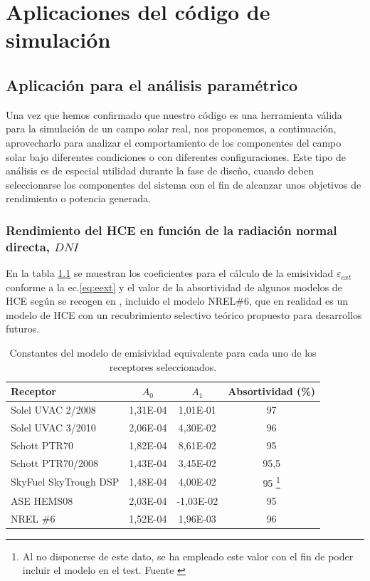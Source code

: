 \chapter{Aplicaciones del código de simulación}
\label{aplicaciones}

\section{Aplicación para el análisis paramétrico}
\label{analisis-parametrico}

Una vez que hemos confirmado que nuestro código es una herramienta válida para la simulación de un campo solar real, nos proponemos, a continuación, aprovecharlo para analizar el comportamiento de los componentes del campo solar bajo diferentes condiciones o con diferentes configuraciones. Este tipo de análisis es de especial utilidad durante la fase de diseño, cuando deben seleccionarse los componentes del sistema con el fin de alcanzar unos objetivos de rendimiento o potencia generada.

\subsection{Rendimiento del HCE en función de la radiación normal directa, $DNI$}

En la tabla \ref{tab:datos_hces} se muestran los coeficientes para el cálculo de la emisividad $\varepsilon_{ext}$ conforme a la ec.\eqref{eq:eext} y el valor de la absortividad de algunos modelos de HCE según se recogen en \cite{barberofresnoDesarrolloModeloTeorico2018}, incluido el modelo NREL\#6, que en realidad es un modelo de HCE con un recubrimiento selectivo teórico propuesto para desarrollos futuros.

\begin{longtable}[c]{lccc}
\caption[Constantes del modelo de emisividad equivalente para cada uno de los receptores seleccionados]{Constantes del modelo de emisividad equivalente para cada uno de los receptores seleccionados.}
\label{tab:datos_hces}  \\ \hline
Receptor &
$A_0$ &
$A_1$ &
Absortividad (\%) \\ \hline
Solel UVAC 2/2008 & 1,31E-04 & 1,01E-01 & 97\\
Solel UVAC 3/2010 & 2,06E-04 & 4,30E-02 & 96 \\
Schott PTR70 & 1,82E-04 & 8,61E-02 & 95 \\
Schott PTR70/2008 & 1,43E-04 & 3,45E-02 & 95,5 \\
SkyFuel SkyTrough DSP & 1,48E-04 & 4,00E-02 & 95 \footnote{Al no disponerse de este dato, se ha empleado este valor con el fin de poder incluir el modelo en el test. Fuente \cite{barberofresnoDesarrolloModeloTeorico2018}}\\
ASE HEMS08 & 2,03E-04 & -1,03E-02 & 95 \\
NREL \#6 & 1,52E-04 & 1,96E-03 & 96 
\end{longtable}




